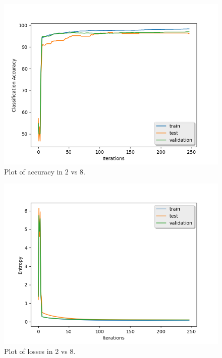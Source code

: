 \documentclass{article} %
\begin{document}
\begin{figure}[h]
\begin{center}
\includegraphics[width=0.8\linewidth]{plt_2vs8_accuracy.png}
\end{center}
\caption{Plot of accuracy in 2 vs 8.}
\end{figure}

\begin{figure}[h]
\begin{center}
\includegraphics[width=0.8\linewidth]{plt_2vs8_losses.png}
\end{center}
\caption{Plot of losses in 2 vs 8.}
\end{figure}
\end{document}
